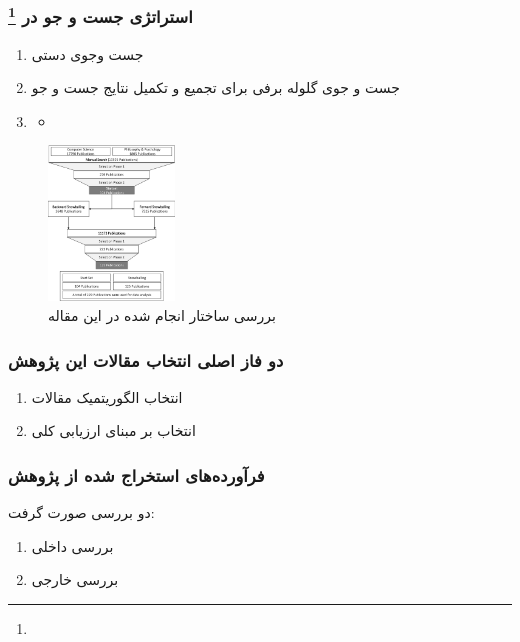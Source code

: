 \documentclass[10pt, a4paper]{beamer}
\begin{document}
\begin{frame}
    \frametitle{استراتژی جست و جو در  \footnote{}}

    \begin{enumerate}
        \item جست وجوی دستی
        \item جست و جوی گلوله برفی برای تجمیع و تکمیل نتایج جست و جو
        \item \begin{itemize}
            \item {}
        \end{itemize}
    \end{enumerate}

    \begin{figure}[H]
        \centering
        \includegraphics[width=0.3\textwidth]{images/slr_order.png}
        \caption{بررسی ساختار  انجام شده در این مقاله}
        \label{fig:slrOrder}
    \end{figure}
\end{frame}

\begin{frame}
    \frametitle{دو فاز اصلی انتخاب مقالات این پژوهش}

    \begin{enumerate}
        \item انتخاب الگوریتمیک مقالات
        \item انتخاب بر مبنای ارزیابی کلی
    \end{enumerate}
\end{frame}

\begin{frame}
    \frametitle{فرآورده‌های استخراج شده از پژوهش}
    دو بررسی صورت گرفت:

    \begin{enumerate}
        \item بررسی داخلی
        \item بررسی خارجی
    \end{enumerate}
\end{frame}
\end{document}
